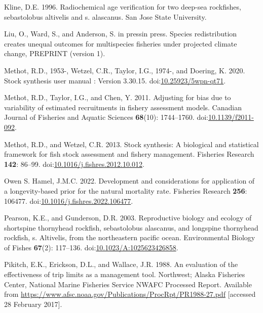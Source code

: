 \documentclass[11pt,
  english,
  letterpaper,
]{article}
\newlength{\cslhangindent}
\newenvironment{CSLReferences}[2] %
 {%
  \setlength{\parindent}{0pt}
  \ifodd #1 \everypar{\setlength{\hangindent}{\cslhangindent}}\ignorespaces\fi
  \ifnum #2 > 0
  \setlength{\parskip}{#2\baselineskip}
  \fi
 }%
 {}
\begin{document}
\begin{CSLReferences}{1}{0}
\leavevmode{}%
Kline, D.E. 1996. Radiochemical age verification for two deep-sea rockfishes, sebastolobus altivelis and s. alascanus. San Jose State University.

\leavevmode{}%
Liu, O., Ward, S., and Anderson, S. in pressin press. Species redistribution creates unequal outcomes for multispecies fisheries under projected climate change, PREPRINT (version 1).

\leavevmode{}%
Methot, R.D., 1953-, Wetzel, C.R., Taylor, I.G., 1974-, and Doering, K. 2020. Stock synthesis user manual : Version 3.30.15. doi:\href{https://doi.org/10.25923/5wpn-qt71}{10.25923/5wpn-qt71}.

\leavevmode{}%
Methot, R.D., Taylor, I.G., and Chen, Y. 2011. Adjusting for bias due to variability of estimated recruitments in fishery assessment models. Canadian Journal of Fisheries and Aquatic Sciences \textbf{68}(10): 1744--1760. doi:\href{https://doi.org/10.1139/f2011-092}{10.1139/f2011-092}.

\leavevmode{}%
Methot, R.D., and Wetzel, C.R. 2013. Stock synthesis: A biological and statistical framework for fish stock assessment and fishery management. Fisheries Research \textbf{142}: 86--99. doi:\href{https://doi.org/10.1016/j.fishres.2012.10.012}{10.1016/j.fishres.2012.10.012}.

\leavevmode{}%
Owen S. Hamel, J.M.C. 2022. Development and considerations for application of a longevity-based prior for the natural mortality rate. Fisheries Research \textbf{256}: 106477. doi:\href{https://doi.org/10.1016/j.fishres.2022.106477}{10.1016/j.fishres.2022.106477}.

\leavevmode{}%
Pearson, K.E., and Gunderson, D.R. 2003. Reproductive biology and ecology of shortspine thornyhead rockfish, sebastolobus alascanus, and longspine thornyhead rockfish, s. Altivelis, from the northeastern pacific ocean. Environmental Biology of Fishes \textbf{67}(2): 117--136. doi:\href{https://doi.org/10.1023/A:1025623426858}{10.1023/A:1025623426858}.

\leavevmode{}%
Pikitch, E.K., Erickson, D.L., and Wallace, J.R. 1988. An evaluation of the effectiveness of trip limits as a management tool. Northwest; Alaska Fisheries Center, National Marine Fisheries Service NWAFC Processed Report. Available from \url{https://www.afsc.noaa.gov/Publications/ProcRpt/PR1988-27.pdf} {[}accessed 28 February 2017{]}.


\end{CSLReferences}
\end{document}
